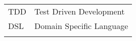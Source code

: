 \begin{spacing}{1.0}
	\begin{longtable}[htbp]{@{}p{} p{}@{}} 

	TDD		&\hspace{-1.5in} Test Driven Development\\	[2ex] %
	DSL		&\hspace{-1.5in} Domain Specific Language\\	[2ex]
	
	\setcounter{table}{0}
	\end{longtable}
\end{spacing}


\pagebreak{}